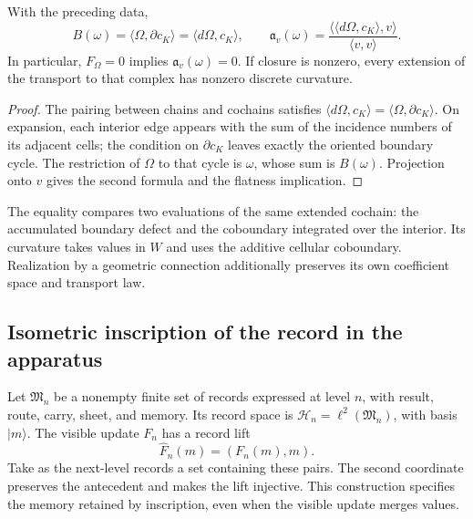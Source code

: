\begin{theorem}
\label{vii:thm:observador-stokes}
With the preceding data,
\begin{equation}
 B(\omega)=\langle\Omega,\partial c_K\rangle
          =\langle d\Omega,c_K\rangle,
 \qquad
 \mathfrak a_v(\omega)
 =\frac{\langle\langle d\Omega,c_K\rangle,v\rangle}
        {\langle v,v\rangle}.
 \label{vii:eq:observador-stokes}
\end{equation}
In particular, \(F_\Omega=0\) implies \(\mathfrak a_v(\omega)=0\).
If closure is nonzero, every extension of the transport to that complex
has nonzero discrete curvature.
\end{theorem}

\begin{proof}
The pairing between chains and cochains satisfies
\(\langle d\Omega,c_K\rangle=\langle\Omega,\partial c_K\rangle\).
On expansion, each interior edge appears with the sum of the incidence
numbers of its adjacent cells; the condition on
\(\partial c_K\) leaves exactly the oriented boundary cycle.
The restriction of \(\Omega\) to that cycle is \(\omega\), whose sum
is \(B(\omega)\). Projection onto \(v\) gives the second formula
and the flatness implication.
\end{proof}

The equality compares two evaluations of the same extended cochain:
the accumulated boundary defect and the coboundary integrated over the interior.
Its curvature takes values in \(W\) and uses the additive cellular coboundary.
Realization by a geometric connection additionally preserves
its own coefficient space and transport law.

\subsection{Isometric inscription of the record in the apparatus}
\label{vii:sec:observador-aparato}

Let \(\mathfrak M_n\) be a nonempty finite set of records
expressed at level \(n\), with result, route, carry, sheet, and memory.
Its record space is
\(\mathcal H_n=\ell^2(\mathfrak M_n)\), with basis \(|m\rangle\).
The visible update \(F_n\) has a record lift
\[
 \widehat F_n(m)=(F_n(m),m).
\]
Take as the next-level records a set containing these
pairs. The second coordinate preserves the antecedent and makes the
lift injective. This construction specifies the memory retained by
inscription, even when the visible update merges values.

